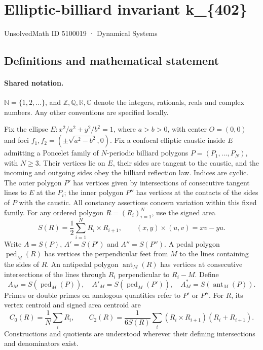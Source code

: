 \documentclass[11pt]{article}
\begin{document}
\setcounter{section}{5100018}
\section{Elliptic-billiard invariant k\_\{402\}}\label{5100019}
{\small\sffamily UnsolvedMath ID 5100019 · Dynamical Systems}
\subsection{Definitions and mathematical statement}

\paragraph{Shared notation.}$\mathbb N=\{1,2,\ldots\}$, and $\mathbb Z,\mathbb Q,\mathbb R,\mathbb C$ denote the integers, rationals, reals and complex numbers. Any other conventions are specified locally.


Fix the ellipse $E:x^2/a^2+y^2/b^2=1$, where $a>b>0$, with center $O=(0,0)$ and foci $f_1,f_2=(\pm\sqrt{a^2-b^2},0)$. Fix a confocal elliptic caustic inside $E$ admitting a Poncelet family of $N$-periodic billiard polygons $P=(P_1,\ldots,P_N)$, with $N\geq3$. Their vertices lie on $E$, their sides are tangent to the caustic, and the incoming and outgoing sides obey the billiard reflection law. Indices are cyclic. The outer polygon $P'$ has vertices given by intersections of consecutive tangent lines to $E$ at the $P_i$; the inner polygon $P''$ has vertices at the contacts of the sides of $P$ with the caustic. All constancy assertions concern variation within this fixed family.
For any ordered polygon $R=(R_i)_{i=1}^N$, use the signed area
\[S(R)=\frac12\sum_{i=1}^N R_i\times R_{i+1},\qquad (x,y)\times(u,v)=xv-yu.\]
Write $A=S(P)$, $A'=S(P')$ and $A''=S(P'')$. A pedal polygon $\operatorname{ped}_M(R)$ has vertices the perpendicular feet from $M$ to the lines containing the sides of $R$. An antipedal polygon $\operatorname{ant}_M(R)$ has vertices at consecutive intersections of the lines through $R_i$ perpendicular to $R_i-M$. Define
\[A_M=S(\operatorname{ped}_M(P)),\quad A'_M=S(\operatorname{ped}_M(P')),\quad A_M^*=S(\operatorname{ant}_M(P)).\]
Primes or double primes on analogous quantities refer to $P'$ or $P''$. For $R$, its vertex centroid and signed area centroid are
\[C_0(R)=\frac1N\sum_i R_i,\qquad C_2(R)=\frac{1}{6S(R)}\sum_i(R_i\times R_{i+1})(R_i+R_{i+1}).\]
Constructions and quotients are understood wherever their defining intersections and denominators exist.
\end{document}
